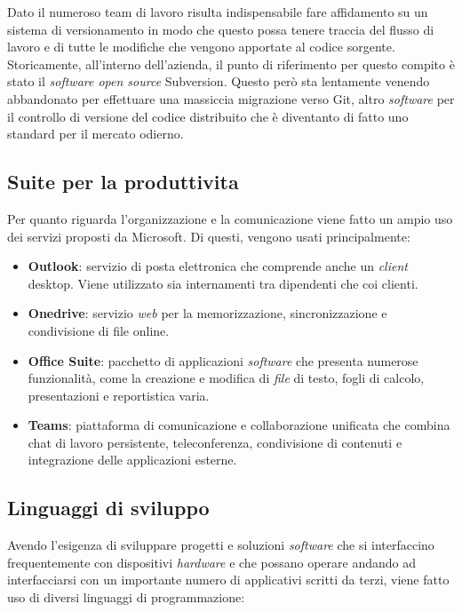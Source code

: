 Dato il numeroso team di lavoro risulta indispensabile fare affidamento su un sistema di versionamento in modo che questo possa tenere traccia del flusso 
di lavoro e di tutte le modifiche che vengono apportate al codice sorgente. Storicamente, all'interno dell'azienda, il punto di riferimento per questo
compito è stato il \emph{software open source} Subversion. Questo però sta lentamente venendo abbandonato per effettuare una massiccia migrazione
verso Git, altro \emph{software} per il controllo di versione del codice distribuito che è diventanto di fatto uno standard per il mercato odierno.

\subsection{Suite per la produttivita}
Per quanto riguarda l'organizzazione e la comunicazione viene fatto un ampio uso dei servizi proposti da Microsoft. Di questi, vengono usati principalmente:
\begin{itemize}
    \item \textbf{Outlook}: servizio di posta elettronica che comprende anche un \emph{client} desktop. Viene utilizzato sia internamenti tra dipendenti che coi clienti.
    \item \textbf{Onedrive}: servizio \emph{web} per la memorizzazione, sincronizzazione e condivisione di file online.
    \item \textbf{Office Suite}: pacchetto di applicazioni \emph{software} che presenta numerose funzionalità, come la creazione e modifica di \emph{file} di testo, fogli di calcolo, presentazioni e reportistica varia.
    \item \textbf{Teams}: piattaforma di comunicazione e collaborazione unificata che combina chat di lavoro persistente, teleconferenza, condivisione di contenuti e integrazione delle applicazioni esterne.
\end{itemize}

\subsection{Linguaggi di sviluppo}

Avendo l'esigenza di sviluppare progetti e soluzioni \emph{software} che si interfaccino frequentemente con dispositivi \emph{hardware} e che possano operare andando ad interfacciarsi
con un importante numero di applicativi scritti da terzi, viene fatto uso di diversi linguaggi di programmazione:

